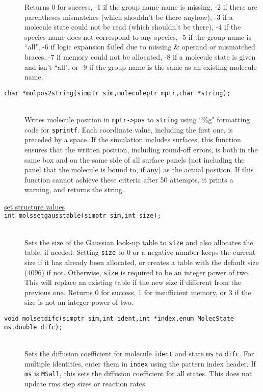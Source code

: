 \documentclass {scrbook}
\newcommand {\ttt} {\texttt}
\begin{document}
\begin{description}
Returns 0 for success, -1 if the group name name is missing, -2 if there are parentheses mismatches (which shouldn't be there anyhow), -3 if a molecule state could not be read (which shouldn't be there), -4 if the species name does not correspond to any species, -5 if the group name is ``all", -6 if logic expansion failed due to missing \& operand or mismatched braces, -7 if memory could not be allocated, -8 if a molecule state is given and isn't ``all", or -9 if the group name is the same as an existing molecule name.

\item[\ttt{char *molpos2string(simptr sim,moleculeptr mptr,char *string);}]
\hfill \\
Writes molecule position in \ttt{mptr->pos} to \ttt{string} using ``\%g" formatting code for \ttt{sprintf}. Each coordinate value, including the first one, is preceded by a space. If the simulation includes surfaces, this function ensures that the written position, including round-off errors, is both in the same box and on the same side of all surface panels (not including the panel that the molecule is bound to, if any) as the actual position. If this function cannot achieve these criteria after 50 attempts, it prints a warning, and returns the string.

\item[\underline{set structure values}]

\item[\ttt{int molssetgausstable(simptr sim,int size);}]
\hfill \\
Sets the size of the Gaussian look-up table to \ttt{size} and also allocates the table, if needed. Setting \ttt{size} to 0 or a negative number keeps the current size if it has already been allocated, or creates a table with the default size (4096) if not. Otherwise, \ttt{size} is required to be an integer power of two. This will replace an existing table if the new size if different from the previous one. Returns 0 for success, 1 for insufficient memory, or 3 if the size is not an integer power of two.

\item[\ttt{void molsetdifc(simptr sim,int ident,int *index,enum MolecState ms,double difc);}]
\hfill \\
Sets the diffusion coefficient for molecule \ttt{ident} and state \ttt{ms} to \ttt{difc}. For multiple identities, enter them in \ttt{index} using the pattern index header. If \ttt{ms} is \ttt{MSall}, this sets the diffusion coefficient for all states. This does not update rms step sizes or reaction rates.


\end{description}
\end{document}
